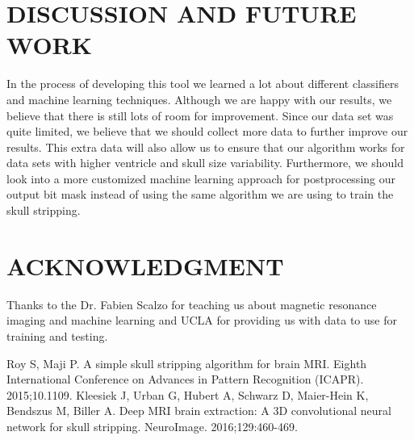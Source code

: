 \documentclass[letterpaper, 10 pt, conference]{ieeeconf}
\begin{document}
\section{DISCUSSION AND FUTURE WORK}
In the process of developing this tool we learned a lot about different classifiers and machine learning techniques. Although we are happy with our results, we believe that there is still lots of room for improvement. Since our data set was quite limited, we believe that we should collect more data to further improve our results. This extra data will also allow us to ensure that our algorithm works for data sets with higher ventricle and skull size variability. Furthermore, we should look into a more customized machine learning approach for postprocessing our output bit mask instead of using the same algorithm we are using to train the skull stripping.

\section*{ACKNOWLEDGMENT}

Thanks to the Dr. Fabien Scalzo for teaching us about magnetic resonance imaging and machine learning and UCLA for providing us with data to use for training and testing.

\begin{thebibliography}{99}

 Roy S, Maji P. A simple skull stripping algorithm for brain MRI. Eighth International Conference on Advances in Pattern Recognition (ICAPR). 2015;10.1109.
 Kleesiek J, Urban G, Hubert A, Schwarz D, Maier-Hein K, Bendszus M, Biller A. Deep MRI brain extraction: A 3D convolutional neural network for skull stripping. NeuroImage. 2016;129:460-469.

\end{thebibliography}
\end{document}
